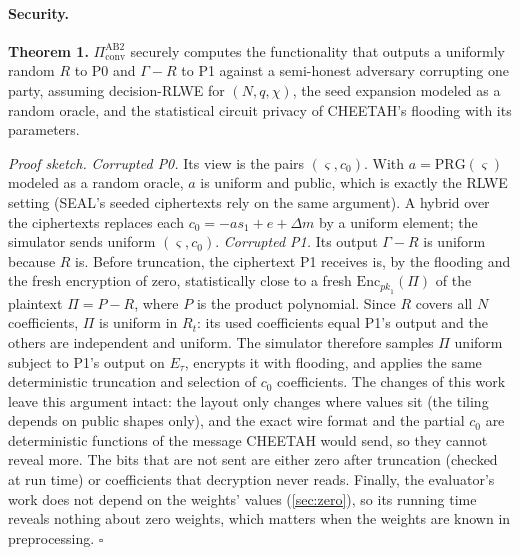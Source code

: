 \paragraph{Security.} \textbf{Theorem 1.} $\Pi^{\mathrm{AB2}}_{\mathrm{conv}}$ securely computes the functionality that
outputs a uniformly random $R$ to P0 and $\Gamma - R$ to P1 against a semi-honest adversary corrupting one party,
assuming decision-RLWE for $(N, q, \chi)$, the seed expansion modeled as a random oracle, and the statistical
circuit privacy of CHEETAH's flooding with its parameters.

\emph{Proof sketch.} \emph{Corrupted P0.} Its view is the pairs $(\varsigma, c_0)$. With $a = \mathrm{PRG}(\varsigma)$
modeled as a random oracle, $a$ is uniform and public, which is exactly the RLWE setting (SEAL's seeded
ciphertexts rely on the same argument). A hybrid over the ciphertexts replaces each $c_0 = -a s_1 + e + \Delta m$ by
a uniform element; the simulator sends uniform $(\varsigma, c_0)$. \emph{Corrupted P1.} Its output
$\Gamma - R$ is uniform because $R$ is. Before truncation, the ciphertext P1 receives is, by the flooding and the fresh
encryption of zero, statistically close to a fresh $\mathrm{Enc}_{\mathit{pk}_1}(\Pi)$ of the plaintext $\Pi = P - R$,
where $P$ is the product polynomial. Since $R$ covers all $N$ coefficients, $\Pi$ is uniform in $R_t$: its used
coefficients equal P1's output and the others are independent and uniform. The simulator therefore samples
$\Pi$ uniform subject to P1's output on $E_\tau$, encrypts it with flooding, and applies the same deterministic
truncation and selection of $c_0$ coefficients. The changes of this work leave this argument intact: the
layout only changes where values sit (the tiling depends on public shapes only), and the exact wire format and the
partial $c_0$ are deterministic functions of the message CHEETAH would send, so they cannot reveal more. The
bits that are not sent are either zero after truncation (checked at run time) or coefficients that decryption
never reads. Finally, the evaluator's work does not depend on the weights' values (\cref{sec:zero}), so its running
time reveals nothing about zero weights, which matters when the weights are known in preprocessing.
\hfill$\square$

